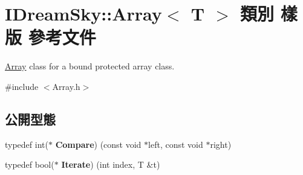 \hypertarget{class_i_dream_sky_1_1_array}{}\section{I\+Dream\+Sky\+:\+:Array$<$ T $>$ 類別 樣版 參考文件}
\label{class_i_dream_sky_1_1_array}


\hyperlink{class_i_dream_sky_1_1_array}{Array} class for a bound protected array class.  




{\ttfamily \#include $<$Array.\+h$>$}

\subsection*{公開型態}
\begin{DoxyCompactItemize}
\item 
typedef int($\ast$ {\bfseries Compare}) (const void $\ast$left, const void $\ast$right)\hypertarget{class_i_dream_sky_1_1_array_aa1b90357e9c1de84525f6cb7dfb68fe3}{}\label{class_i_dream_sky_1_1_array_aa1b90357e9c1de84525f6cb7dfb68fe3}

\item 
typedef bool($\ast$ {\bfseries Iterate}) (int index, T \&t)\hypertarget{class_i_dream_sky_1_1_array_a81300f9ed90bcd328ebbf9904a8d9629}{}\label{class_i_dream_sky_1_1_array_a81300f9ed90bcd328ebbf9904a8d9629}

\end{DoxyCompactItemize}

